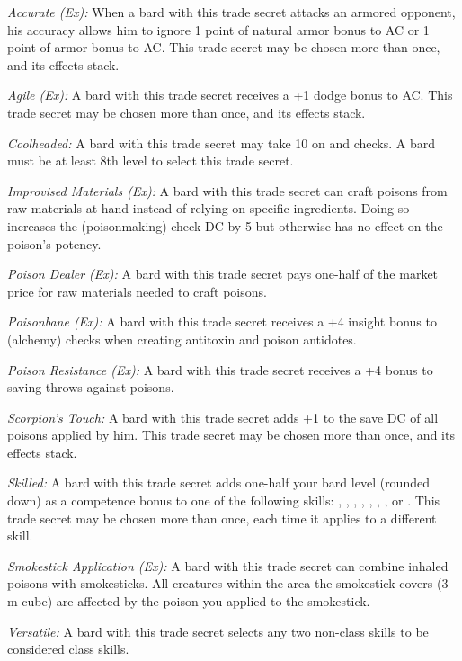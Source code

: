 \textit{Accurate (Ex):} When a bard with this trade secret attacks an armored opponent, his accuracy allows him to ignore 1 point of natural armor bonus to AC or 1 point of armor bonus to AC. This trade secret may be chosen more than once, and its effects stack.

\textit{Agile (Ex):} A bard with this trade secret receives a +1 dodge bonus to AC. This trade secret may be chosen more than once, and its effects stack.

\textit{Coolheaded:} A bard with this trade secret may take 10 on  and  checks. A bard must be at least 8th level to select this trade secret.

\textit{Improvised Materials (Ex):} A bard with this trade secret can craft poisons from raw materials at hand instead of relying on specific ingredients. Doing so increases the  (poisonmaking) check DC by 5 but otherwise has no effect on the poison's potency.

\textit{Poison Dealer (Ex):} A bard with this trade secret pays one-half of the market price for raw materials needed to craft poisons.

\textit{Poisonbane (Ex):} A bard with this trade secret receives a +4 insight bonus to  (alchemy) checks when creating antitoxin and poison antidotes.

\textit{Poison Resistance (Ex):} A bard with this trade secret receives a +4 bonus to saving throws against poisons.

\textit{Scorpion's Touch:} A bard with this trade secret adds +1 to the save DC of all poisons applied by him. This trade secret may be chosen more than once, and its effects stack.

\textit{Skilled:} A bard with this trade secret adds one-half your bard level (rounded down) as a competence bonus to one of the following skills: , , , , , , ,  or . This trade secret may be chosen more than once, each time it applies to a different skill.

\textit{Smokestick Application (Ex):} A bard with this trade secret can combine inhaled poisons with smokesticks. All creatures within the area the smokestick covers (3-m cube) are affected by the poison you applied to the smokestick.

\textit{Versatile:} A bard with this trade secret selects any two non-class skills to be considered class skills.

